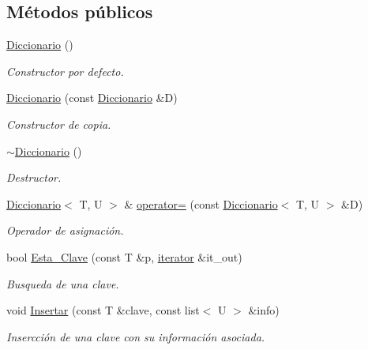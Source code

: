 \subsection*{Métodos públicos}
\begin{DoxyCompactItemize}
\item 
\hyperlink{classDiccionario_adad32f7bfd34b7a8631ff5f26033b369}{Diccionario} ()
\begin{DoxyCompactList}\small\item\em Constructor por defecto. \end{DoxyCompactList}\item 
\hyperlink{classDiccionario_ad8917f4e401b473139403dc5964e8307}{Diccionario} (const \hyperlink{classDiccionario}{Diccionario} \&D)
\begin{DoxyCompactList}\small\item\em Constructor de copia. \end{DoxyCompactList}\item 
\hyperlink{classDiccionario_a006b21559ae7e1b449c785fc47dfb04d}{$\sim$\+Diccionario} ()
\begin{DoxyCompactList}\small\item\em Destructor. \end{DoxyCompactList}\item 
\hyperlink{classDiccionario}{Diccionario}$<$ T, U $>$ \& \hyperlink{classDiccionario_a5fa4a649047e6d270132bf0448a05915}{operator=} (const \hyperlink{classDiccionario}{Diccionario}$<$ T, U $>$ \&D)
\begin{DoxyCompactList}\small\item\em Operador de asignación. \end{DoxyCompactList}\item 
bool \hyperlink{classDiccionario_a16314351b0600835ade3c7add2ffe040}{Esta\+\_\+\+Clave} (const T \&p, \hyperlink{classDiccionario_1_1iterator}{iterator} \&it\+\_\+out)
\begin{DoxyCompactList}\small\item\em Busqueda de una clave. \end{DoxyCompactList}\item 
void \hyperlink{classDiccionario_af520b73907852cc8002260ddf9fb822c}{Insertar} (const T \&clave, const list$<$ U $>$ \&info)
\begin{DoxyCompactList}\small\item\em Insercción de una clave con su información asociada. \end{DoxyCompactList}\item 

\end{DoxyCompactItemize}
